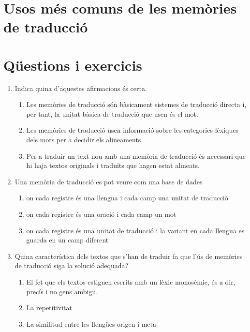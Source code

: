 \section{Usos més comuns de les memòries de traducció}
\label{se:usosmemtrad}

\section{Qüestions i exercicis}

\begin{enumerate}
\item Indica quina d'aquestes afirmacions és certa.
\begin{enumerate}
\item Les memòries de traducció són bàsicament sistemes de
     traducció directa i, per tant, la unitat bàsica de traducció que
     usen és el mot.
\item Les memòries de traducció usen informació sobre les
     categories lèxiques dels mots per a decidir els alineaments.
\item Per a traduir un text nou amb una memòria de traducció
     és necessari que hi haja textos
     originals i traduïts que hagen estat alineats.
\end{enumerate}

\item Una memòria de traducció es pot veure com una base de dades 
   
\begin{enumerate}
\item on cada registre és una llengua i cada camp una unitat de
      traducció
\item on cada registre és una oració i cada camp un mot
\item on cada registre és una unitat de traducció i la variant en
      cada llengua es guarda en un camp diferent
\end{enumerate}

\item Quina característica dels textos que s'han de traduir fa que
   l'ús de memòries de traducció siga la solució adequada?
   
\begin{enumerate}
\item El fet que els textos estiguen escrits amb un lèxic
      monosèmic, és a dir, precís i no gens ambigu.
\item La repetitivitat
\item La similitud entre les llengües origen i meta
\end{enumerate}


\end{enumerate}
